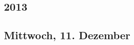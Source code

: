 \documentclass[11pt, twoside, a4paper]{article}
\begin{document}
	\tableofcontents
	\clearpage
	\begin{multicols}{2}
		\section{2013}
		\subsection{Mittwoch, 11. Dezember}
		\blindtext
		\clearpage
		\blindtext
	\end{multicols}
\end{document}
